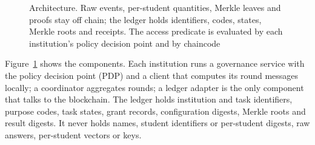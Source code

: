 \documentclass[pdflatex,iicol,sn-mathphys-num]{sn-jnl}
\theoremstyle{thmstyleone}
\newenvironment{widefigure}{\begin{figure}[t]}{\end{figure}}
\begin{document}
\begin{widefigure}
{}
\caption{Architecture. Raw events, per-student quantities, Merkle leaves and proofs stay off chain; the ledger holds identifiers, codes, states, Merkle roots and receipts. The access predicate is evaluated by each institution's policy decision point and by chaincode}
\label{fig:arch}
\end{widefigure}

Figure~\ref{fig:arch} shows the components. Each institution runs a governance service with the policy decision point (PDP) and a client that computes its round messages locally; a coordinator aggregates rounds; a ledger adapter is the only component that talks to the blockchain. The ledger holds institution and task identifiers, purpose codes, task states, grant records, configuration digests, Merkle roots and result digests. It never holds names, student identifiers or per-student digests, raw answers, per-student vectors or keys.
\end{document}
